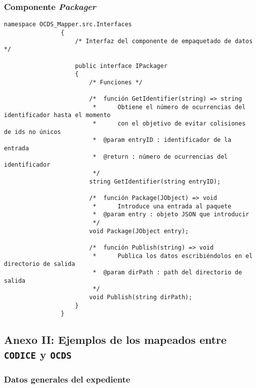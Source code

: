         \subsubsection{Componente \textit{Packager}}
            \begin{lstlisting}[language=lCSharp]
                namespace OCDS_Mapper.src.Interfaces
                {
                    /* Interfaz del componente de empaquetado de datos  */
                
                    public interface IPackager
                    {
                        /* Funciones */
                
                        /*  función GetIdentifier(string) => string
                         *      Obtiene el número de ocurrencias del identificador hasta el momento
                         *      con el objetivo de evitar colisiones de ids no únicos
                         *  @param entryID : identificador de la entrada
                         *  @return : número de ocurrencias del identificador
                         */
                        string GetIdentifier(string entryID);
                
                        /*  función Package(JObject) => void
                         *      Introduce una entrada al paquete
                         *  @param entry : objeto JSON que introducir
                         */
                        void Package(JObject entry);
                
                        /*  función Publish(string) => void
                         *      Publica los datos escribiéndolos en el directorio de salida
                         *  @param dirPath : path del directorio de salida
                         */
                        void Publish(string dirPath);
                    }
                }
            \end{lstlisting}
            
\newpage

    \subsection{Anexo II: Ejemplos de los mapeados entre \texttt{CODICE} y \texttt{OCDS}} \label{annex:correspondencias}

        \subsubsection{Datos generales del expediente}

